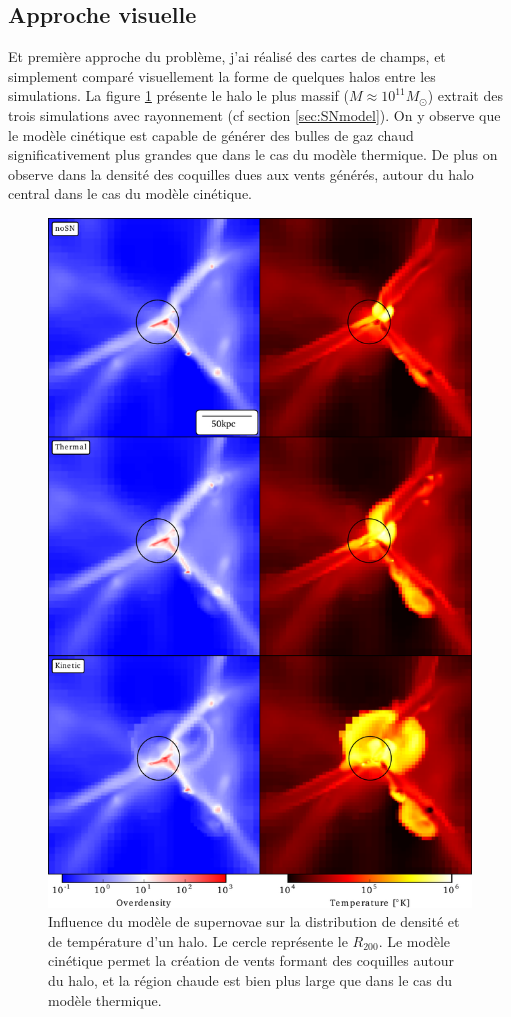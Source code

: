 \subsection{Approche visuelle}
\label{sec:snmaps}

Et première approche du problème, j'ai réalisé des cartes de champs, et simplement comparé visuellement la forme de quelques halos entre les simulations.
La figure \ref{fig:halo} présente le halo le plus massif ($M\approx10^{11} M_\odot$) extrait des trois simulations avec rayonnement (cf section \ref{sec:SNmodel}).
On y observe que le modèle cinétique est capable de générer des bulles de gaz chaud significativement plus grandes que dans le cas du modèle thermique.
De plus on observe dans la densité des coquilles dues aux vents générés, autour du halo central dans le cas du modèle cinétique.

\begin{figure}
		\includegraphics[width=.95\linewidth]{img/03/halos.pdf}
        \caption[Influence du modèle de supernovae sur la forme des halos]{Influence du modèle de supernovae sur la distribution de densité et de température d'un halo.
        Le cercle représente le $R_{200}$.
        Le modèle cinétique permet la création de vents formant des coquilles autour du halo, et la région chaude est bien plus large que dans le cas du modèle thermique.
 		\label{fig:halo}}
\end{figure}


